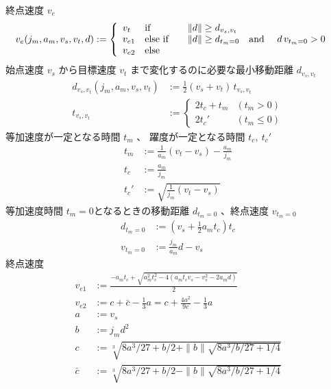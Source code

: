 \documentclass[a5paper]{ltjsarticle}
\begin{document}
終点速度 $v_e$
\begin{align}
    v_e(j_m,a_m,v_s,v_t,d) & :=
    \left\{
    \begin{array}{lll}
        v_t    & \mbox{if\quad}      & \|d\| \geq d_{v_s,v_t}
        \\
        v_{e1} & \mbox{else if\quad} & \|d\| \geq d_{t_m=0} \mbox{\quad and \quad} d\, v_{t_m=0} > 0
        \\
        v_{e2} & \mbox{else}
    \end{array}
    \right.
\end{align}
始点速度 $v_s$ から目標速度 $v_t$ まで変化するのに必要な最小移動距離 $d_{v_s,v_t}$
\begin{align}
    d_{v_s,v_t}(j_m,a_m,v_s,v_t) & := \frac{1}{2}(v_s+v_t) \, t_{v_s,v_t} \\
    t_{v_s,v_t}                  & :=
    \left\{\begin{array}{ll}
        2t_c + t_m & (t_m>0)    \\
        2t_c'      & (t_m\leq0)
    \end{array}\right.
\end{align}
等加速度が一定となる時間 $t_m$ 、
躍度が一定となる時間 $t_c,~t_c'$
\begin{align}
    t_m  & := \frac{1}{a_m}(v_t - v_s) - \frac{a_m}{j_m} \\
    t_c  & := \frac{a_m}{j_m}                            \\
    t_c' & := \sqrt{\frac{1}{j_m}(v_t-v_s)}
\end{align}
等加速度時間 $t_m = 0$となるときの移動距離 $d_{t_m=0}$ 、終点速度 $v_{t_m=0}$
\begin{align}
    d_{t_m=0} & := \left( v_s + \frac{1}{2}a_m t_c \right) t_c
    \\
    v_{t_m=0} & := \frac{j_m}{a_m} d - v_s
\end{align}
終点速度
\begin{align}
    v_{e1}  & := \frac{-a_m t_c + \sqrt{a_m^2 t_c^2-4(a_m t_c v_s - v_s^2 - 2a_m d)}}{2}
    \\
    v_{e2}  & := c +\bar{c} - \frac{1}{3} a = c + \frac{4a^2}{9c} - \frac{1}{3} a
    \\
    a       & := v_s
    \\
    b       & := j_m d^2
    \\
    c       & := \sqrt[3]{8a^3/27+b/2 + \|b\|\sqrt{8a^3/b/27+1/4}}
    \\
    \bar{c} & := \sqrt[3]{8a^3/27+b/2 - \|b\|\sqrt{8a^3/b/27+1/4}}
\end{align}
\end{document}
